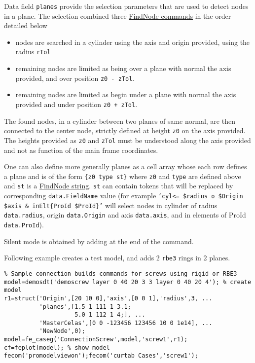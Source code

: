 \begin{SDT}
Data field {\tt planes} provide the selection parameters that are used to detect nodes in a plane. The selection combined three \hyperlink{findnode}{FindNode commands} in the order detailed below
\begin{itemize}
\item nodes are searched in a cylinder using the axis and origin provided, using the radius {\tt rTol}
\item remaining nodes are limited as being over a plane with normal the axis provided, and over position {\tt z0 - zTol}.
\item remaining nodes are limited as begin under a plane with normal the axis provided and under position {\tt z0 + zTol}.
\end{itemize}

The found nodes, in a cylinder between two planes of same normal, are then connected to the center node, strictly defined at height {\tt z0} on the axis provided. The heights provided as {\tt z0} and {\tt zTol} must be understood along the axis provided and not as function of the main frame coordinates.

One can also define more generally planes as a cell array whose each row defines a plane and is of the form {\tt \{z0 type st\}} where {\tt z0} and {\tt type} are defined above and {\tt st} is a \hyperlink{findnode}{FindNode string}. {\tt st} can contain  tokens that will be replaced by corresponding {\tt data.FieldName} value (for example {\tt 'cyl<= \$radius o \$Origin \$axis \& inElt\{ProId \$ProId\}'} will select nodes in cylinder of radius {\tt data.radius}, origin {\tt data.Origin} and axis {\tt data.axis}, and in elements of ProId {\tt data.ProId}).

Silent mode is obtained by adding \ts{;} at the end of the command.

Following example creates a test model, and adds 2 {\tt rbe3} rings in 2 planes.

\begin{verbatim}
% Sample connection builds commands for screws using rigid or RBE3
model=demosdt('demoscrew layer 0 40 20 3 3 layer 0 40 20 4'); % create model
r1=struct('Origin',[20 10 0],'axis',[0 0 1],'radius',3, ...
          'planes',[1.5 1 111 1 3.1;
                    5.0 1 112 1 4;], ...
          'MasterCelas',[0 0 -123456 123456 10 0 1e14], ...
          'NewNode',0);
model=fe_caseg('ConnectionScrew',model,'screw1',r1);
cf=feplot(model); % show model 
fecom('promodelviewon');fecom('curtab Cases','screw1');


\end{verbatim}
\end{SDT}
